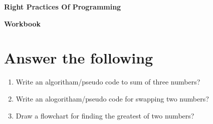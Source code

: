 \documentclass[11pt,a4paper]{article}
\def\AnswerBox{\fbox{\begin{minipage}{5in}\hfill\vspace{1.95in}\end{minipage}}}
\begin{document}
\centerline{\huge{ \textbf{Right Practices Of Programming}}}
\vspace{1pc}
\centerline{\Large{ \textbf{Workbook }}}
\section*{Answer the following}
\begin{enumerate}
\item Write an algoritham/pseudo code to sum of three numbers?

\AnswerBox

\item Write an alogoritham/pseudo code for swapping two numbers?

\AnswerBox

\item Draw a flowchart for finding the greatest of two numbers?

\AnswerBox
\end{enumerate}
\end{document}
